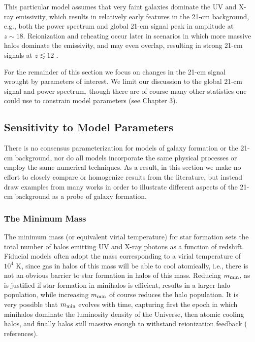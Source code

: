 This particular model \cite{Mesinger2016} assumes that very faint galaxies dominate the UV and X-ray emissivity, which results in relatively early features in the 21-cm background, e.g., both the power spectrum and global 21-cm signal peak in amplitude at $z \sim 18$. Reionization and reheating occur later in scenarios in which more massive halos dominate the emissivity, and may even overlap, resulting in strong 21-cm signals at $z \lesssim 12$ \cite{Mesinger2016,Mirocha2017,Park2019}. 

For the remainder of this section we focus on changes in the 21-cm signal wrought by parameters of interest. We limit our discussion to the global 21-cm signal and power spectrum, though there are of course many other statistics one could use to constrain model parameters (see Chapter 3).


\subsection{Sensitivity to Model Parameters}
There is no consensus parameterization for models of galaxy formation or the 21-cm background, nor do all models incorporate the same physical processes or employ the same numerical techniques. As a result, in this section we make no effort to closely compare or homogenize results from the literature, but instead draw examples from many works in order to illustrate different aspects of the 21-cm background as a probe of galaxy formation.


\subsubsection{The Minimum Mass}
The minimum mass (or equivalent virial temperature) for star formation sets the total number of halos emitting UV and X-ray photons as a function of redshift. Fiducial models often adopt the mass corresponding to a virial temperature of $10^4$ K, since gas in halos of this mass will be able to cool atomically, i.e., there is not an obvious barrier to star formation in halos of this mass. Reducing $m_{\text{min}}$, as is justified if star formation in minihalos is efficient, results in a larger halo population, while increasing $m_{\text{min}}$ of course reduces the halo population. It is very possible that $m_{\text{min}}$ evolves with time, capturing first the epoch in which minihalos dominate the luminosity density of the Universe, then atomic cooling halos, and finally halos still massive enough to withstand reionization feedback ({\color{red} references}).

